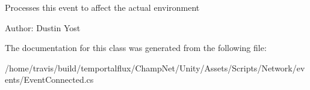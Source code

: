Processes this event to affect the actual environment 

Author\-: Dustin Yost 

The documentation for this class was generated from the following file\-:\begin{DoxyCompactItemize}
\item 
/home/travis/build/temportalflux/\-Champ\-Net/\-Unity/\-Assets/\-Scripts/\-Network/events/Event\-Connected.\-cs\end{DoxyCompactItemize}
